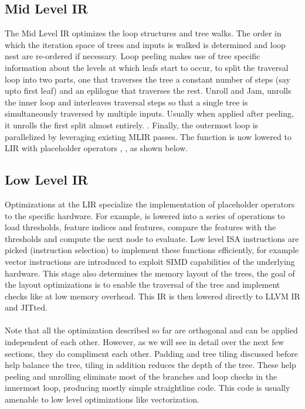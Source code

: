 \subsection{Mid Level IR}
The Mid Level IR optimizes the loop structures and tree walks. The order in which the iteration space of trees and inputs is walked is determined and loop nest are re-ordered if necessary. Loop peeling makes use of tree specific information about the levels at which leafs start to occur, to split the traversal loop into two parts, one that traverses the tree a constant number of steps (say upto first leaf) and an eplilogue that traverses the rest. Unroll and Jam, unrolls the inner loop and interleaves traversal steps so that a single tree is simultaneously traversed by multiple inputs. Usually when applied after peeling, it unrolls the first split almost entirely. . Finally, the outermost loop is parallelized by leveraging existing MLIR passes.
The  function is now lowered to LIR with placeholder operators , ,  as shown below.  

\subsection{Low Level IR}
Optimizations at the LIR specialize the implementation of placeholder operators to the specific hardware. 
 For example,  is lowered into a series of operations to load thresholds, feature indices and features, compare the features with the thresholds and compute the next node to evaluate. Low level ISA instructions are picked (instruction selection) to implement these functions efficiently, for example vector instructions are introduced to exploit SIMD capabilities of the underlying hardware. This stage also determines the memory layout of the trees, the goal of the layout optimizations is to enable the traversal of the tree and implement checks like  at low memory overhead. 
This IR is then lowered directly to LLVM IR and JITted.\\
\\
  \noindent
Note that all the optimization described so far are orthogonal and can be applied independent of each other. However, as we will see in detail over the next few sections, they do compliment each other. Padding and tree tiling discussed before help balance the tree, tiling in addition reduces the depth of the tree. These help peeling and unrolling eliminate most of the branches and loop checks in the innermost loop, producing mostly simple straightline code. This code is usually amenable to low level optimizations like vectorization.  



